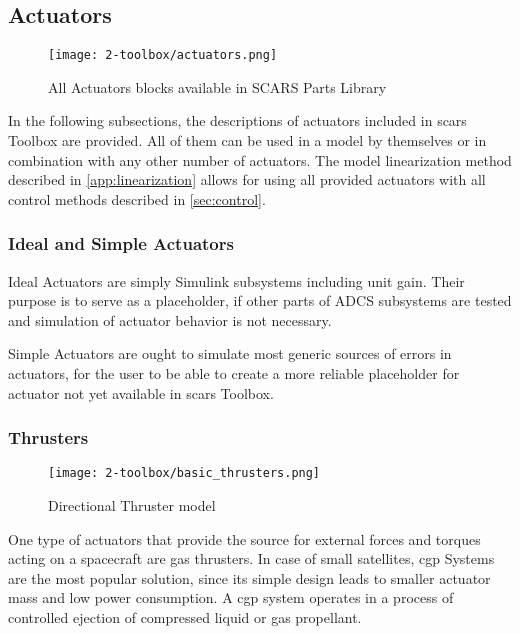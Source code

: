 \clearpage
\subsection{Actuators}\label{sec:actuators}
    \begin{figure}[H]
        \centering
        \texttt{[image: 2-toolbox/actuators.png]}
        \caption{All Actuators blocks available in SCARS Parts Library}
        \label{fig:actuators}
    \end{figure}
    In the following subsections, the descriptions of actuators included in \ac{scars} Toolbox are provided. All of them can be used in a model by themselves or in combination with any other number of actuators. The model linearization method described in \autoref{app:linearization} allows for using all provided actuators with all control methods described in \autoref{sec:control}. 

    \subsubsection{Ideal and Simple Actuators}
        Ideal Actuators are simply Simulink subsystems including unit gain. Their purpose is to serve as a placeholder, if other parts of ADCS subsystems are tested and simulation of actuator behavior is not necessary.

        Simple Actuators are ought to simulate most generic sources of errors in actuators, for the user to be able to create a more reliable placeholder for actuator not yet available in \ac{scars} Toolbox.


    \subsubsection{Thrusters}

        \begin{figure}[H]
            \centering
            \texttt{[image: 2-toolbox/basic\_thrusters.png]}
            \caption{Directional Thruster model}
            \label{fig:basic_thrusters}
        \end{figure}

        One type of actuators that provide the source for external forces and torques acting on a spacecraft are gas thrusters. In case of small satellites, \ac{cgp} Systems are the most popular solution, since its simple design leads to smaller actuator mass and low power consumption. A \ac{cgp} system operates in a process of controlled ejection of compressed liquid or gas propellant. 
        

